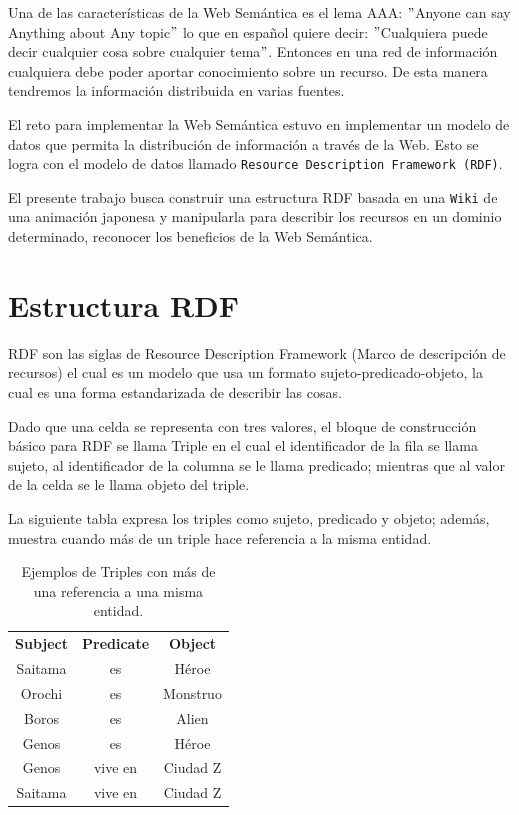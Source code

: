\documentclass[conference]{IEEEtran}
\begin{document}
Una de las características de la Web Semántica es el lema AAA: $"$Anyone can say Anything about Any topic$"$ lo que en español quiere decir: 
$"$Cualquiera puede decir cualquier cosa sobre cualquier tema$"$. 
Entonces en una red de información cualquiera debe poder aportar conocimiento sobre un recurso. 
De esta manera tendremos la información distribuida en varias fuentes.

El reto para implementar la Web Semántica estuvo en implementar un modelo de datos que permita la distribución de información a través de la Web.
Esto se logra con el modelo de datos llamado \texttt{Resource Description Framework (RDF)}.

El presente trabajo busca construir una estructura RDF basada en una \texttt{Wiki} de una animación japonesa y manipularla para describir los recursos en un dominio determinado, reconocer los beneficios de la Web Semántica.




\section{Estructura RDF}

RDF son las siglas de Resource Description Framework (Marco de descripción de recursos) el cual es un modelo que usa un formato sujeto-predicado-objeto, la cual es una forma estandarizada de describir las cosas.

Dado que una celda se representa con tres valores, el bloque de construcción básico para RDF se llama Triple en el cual el identificador de la fila se llama sujeto, al identificador de la columna se le llama predicado; mientras que al valor de la celda se le llama objeto del triple.



La siguiente tabla expresa los triples como sujeto, predicado y objeto; además, muestra cuando más de un triple hace referencia a la misma entidad.

\begin{table}[H]
\begin{center}
\begin{tabular}{|c|c|c|}
\textbf{Subject}& \textbf{Predicate} & \textbf{Object}  \\
     Saitama & es & Héroe \\
     Orochi & es & Monstruo\\
     Boros & es & Alien \\
     Genos & es & Héroe \\
     Genos & vive en & Ciudad Z \\
     Saitama & vive en & Ciudad Z
\end{tabular}
\end{center}
\caption{Ejemplos de Triples con más de una referencia a una misma entidad.}
\end{table}
\end{document}
